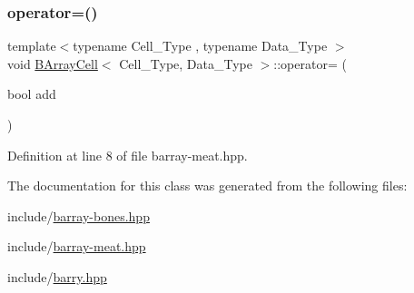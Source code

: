 \subsubsection{\texorpdfstring{operator=()}{operator=()}}
{\footnotesize\ttfamily template$<$typename Cell\+\_\+\+Type , typename Data\+\_\+\+Type $>$ \\
void \hyperlink{class_b_array_cell}{B\+Array\+Cell}$<$ Cell\+\_\+\+Type, Data\+\_\+\+Type $>$\+::operator= (\begin{DoxyParamCaption}\item[{bool}]{add }\end{DoxyParamCaption})\hspace{0.3cm}{\ttfamily [inline]}}



Definition at line 8 of file barray-\/meat.\+hpp.



The documentation for this class was generated from the following files\+:\begin{DoxyCompactItemize}
\item 
include/\hyperlink{barray-bones_8hpp}{barray-\/bones.\+hpp}\item 
include/\hyperlink{barray-meat_8hpp}{barray-\/meat.\+hpp}\item 
include/\hyperlink{barry_8hpp}{barry.\+hpp}\end{DoxyCompactItemize}
